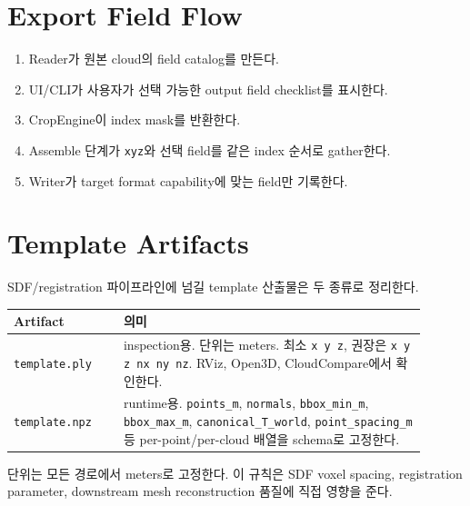 \section{Export Field Flow}

\begin{enumerate}
  \item Reader가 원본 cloud의 field catalog를 만든다.
  \item UI/CLI가 사용자가 선택 가능한 output field checklist를 표시한다.
  \item CropEngine이 index mask를 반환한다.
  \item Assemble 단계가 \texttt{xyz}와 선택 field를 같은 index 순서로 gather한다.
  \item Writer가 target format capability에 맞는 field만 기록한다.
\end{enumerate}

\section{Template Artifacts}

SDF/registration 파이프라인에 넘길 template 산출물은 두 종류로 정리한다.

\begin{longtable}{p{0.24\linewidth}p{0.66\linewidth}}
\toprule
\textbf{Artifact} & \textbf{의미} \\
\midrule
\texttt{template.ply} & inspection용. 단위는 meters. 최소 \texttt{x y z},
권장은 \texttt{x y z nx ny nz}. RViz, Open3D, CloudCompare에서 확인한다. \\
\texttt{template.npz} & runtime용. \texttt{points\_m}, \texttt{normals},
\texttt{bbox\_min\_m}, \texttt{bbox\_max\_m}, \texttt{canonical\_T\_world},
\texttt{point\_spacing\_m} 등 per-point/per-cloud 배열을 schema로 고정한다. \\
\bottomrule
\end{longtable}

단위는 모든 경로에서 meters로 고정한다. 이 규칙은 SDF voxel spacing,
registration parameter, downstream mesh reconstruction 품질에 직접 영향을 준다.

